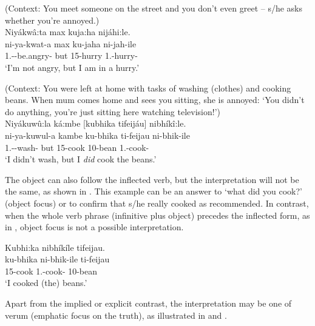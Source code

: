 \documentclass[output=paper]{langscibook}
\begin{document}
\ea
\label{bkm:Ref120700101}
(Context: You meet someone on the street and you don’t even greet -- s/he asks whether you’re annoyed.)\\
Niyákwâ:ta max kuja:ha nijáhi:le.\\
\gll
ni-ya-kwat-a  max  ku-jaha  ni-jah-ile\\
1\SG.\SM-\NEG{}-be.angry-\FV{}  but  15-hurry  1\SG.\SM-hurry-\PFV{}\\
‘I’m not angry, but I am in a hurry.’

\ex
\label{bkm:Ref120700108}
\label{bkm:Ref141367009}(Context: You were left at home with tasks of washing (clothes) and cooking beans. When mum comes home and sees you sitting, she is annoyed: ‘You didn’t do anything, you’re just sitting here watching television!’)\\
Niyákuwû:la ká:mbe [kubhika tifeijáu] nibhíkî:le.\\
\gll
ni-ya-kuwul-a  kambe  ku-bhika  ti-feijau  ni-bhik-ile\\
1\SG.\SM-\NEG{}-wash-\FV{}  but  15-cook  10-bean  1\SG.\SM{}-cook-\PFV{}\\
\glt
‘I didn’t wash, but I \textit{did} cook the beans.’\\

\z

The object can also follow the inflected verb, but the interpretation will not be the same, as shown in . This example can be an answer to ‘what did you cook?’ (object focus) or to confirm that s/he really cooked as recommended. In contrast, when the whole verb phrase (infinitive plus object) precedes the inflected form, as in , object focus is not a possible interpretation.

\ea
\label{bkm:Ref120700122}
Kubhi:ka nibhíkíle tifeijau.\\
\gll
ku-bhika  ni-bhik-ile  ti-feijau\\
15-cook  1\SG.\SM{}-cook-\PFV{}  10-bean\\
\glt
‘I cooked (the) beans.’\\

\z

Apart from the implied or explicit contrast, the interpretation may be one of verum (emphatic focus on the truth), as illustrated in  and .
\end{document}
